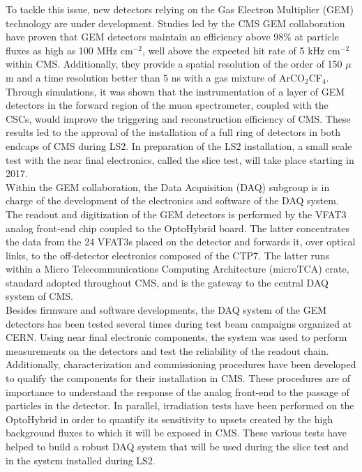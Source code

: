  To tackle this issue, new detectors relying on the Gas Electron Multiplier (GEM) technology are under development. Studies led by the CMS GEM collaboration have proven that GEM detectors maintain an efficiency above 98\% at particle fluxes as high as 100 MHz cm$^{-2}$, well above the expected hit rate of 5 kHz cm$^{-2}$ within CMS. Additionally, they provide a spatial resolution of the order of 150 $\mu$m and a time resolution better than 5 ns with a gas mixture of ArCO$_2$CF$_4$. Through simulations, it was shown that the instrumentation of a layer of GEM detectors in the forward region of the muon spectrometer, coupled with the CSCs, would improve the triggering and reconstruction efficiency of CMS. These results led to the approval of the installation of a full ring of detectors in both endcaps of CMS during LS2. In preparation of the LS2 installation, a small scale test with the near final electronics, called the slice test, will take place starting in 2017. \\

  Within the GEM collaboration, the Data Acquisition (DAQ) subgroup is in charge of the development of the electronics and software of the DAQ system. The readout and digitization of the GEM detectors is performed by the VFAT3 analog front-end chip coupled to the OptoHybrid board. The latter concentrates the data from the 24 VFAT3s placed on the detector and forwards it, over optical links, to the off-detector electronics composed of the CTP7. The latter runs within a Micro Telecommunications Computing Architecture (microTCA) crate, standard adopted throughout CMS, and is the gateway to the central DAQ system of CMS. \\

  Besides firmware and software developments, the DAQ system of the GEM detectors has been tested several times during test beam campaigns organized at CERN. Using near final electronic components, the system was used to perform measurements on the detectors and test the reliability of the readout chain. Additionally, characterization and commissioning procedures have been developed to qualify the components for their installation in CMS. These procedures are of importance to understand the response of the analog front-end to the passage of particles in the detector. In parallel, irradiation tests have been performed on the OptoHybrid in order to quantify its sensitivity to upsets created by the high background fluxes to which it will be exposed in CMS. These various tests have helped to build a robust DAQ system that will be used during the slice test and in the system installed during LS2. \\

